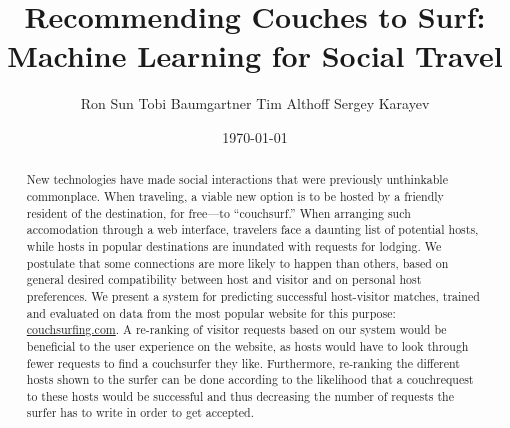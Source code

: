 \documentclass{article}
\title{Recommending Couches to Surf: Machine Learning for Social Travel}
\author{Ron Sun \And Tobi Baumgartner \And Tim Althoff \And Sergey Karayev}
\date{\today}
\begin{document}
\maketitle

\begin{abstract}
New technologies have made social interactions that were previously unthinkable commonplace.
When traveling, a viable new option is to be hosted by a friendly resident of the destination, for free---to ``couchsurf.''
When arranging such accomodation through a web interface, travelers face a daunting list of potential hosts, while hosts in popular destinations are inundated with requests for lodging.
We postulate that some connections are more likely to happen than others, based on general desired compatibility between host and visitor and on personal host preferences.
We present a system for predicting successful host-visitor matches, trained and evaluated on data from the most popular website for this purpose: \url{couchsurfing.com}.
A re-ranking of visitor requests based on our system would be beneficial to the user experience on the website, as hosts would have to look through fewer requests to find a couchsurfer they like.
Furthermore, re-ranking the different hosts shown to the surfer can be done according to the likelihood that a couchrequest to these hosts would be successful and thus decreasing the number of requests the surfer has to write in order to get accepted.
\end{abstract}










\small

\end{document}
